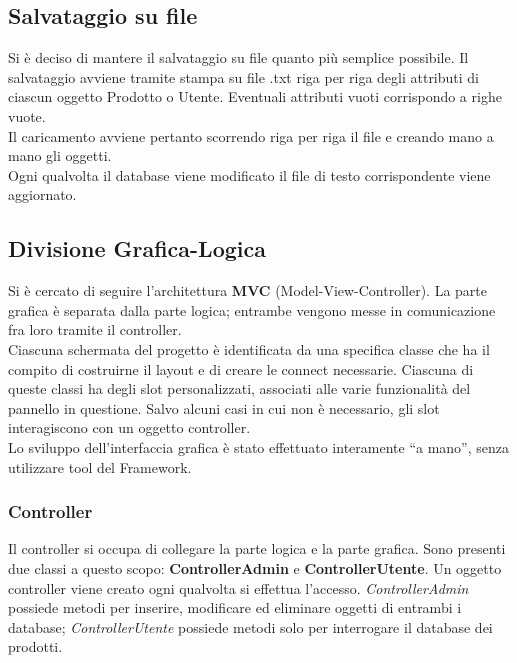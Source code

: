 \documentclass[a4paper,10pt] {article}
\begin{document}
\subsection{Salvataggio su file}
Si è deciso di mantere il salvataggio su file quanto più semplice possibile. Il 
salvataggio avviene tramite stampa su file .txt riga per riga degli attributi 
di 
ciascun oggetto Prodotto o Utente. Eventuali attributi vuoti corrispondo a 
righe 
vuote.\\
Il caricamento avviene pertanto scorrendo riga per riga il file e creando mano 
a 
mano gli oggetti.\\
Ogni qualvolta il database viene modificato il file di testo corrispondente 
viene aggiornato.

\subsection{Divisione Grafica-Logica}
Si è cercato di seguire l'architettura \textbf{MVC} (Model-View-Controller). La 
parte grafica è separata dalla parte logica; entrambe vengono messe in 
comunicazione
fra loro tramite il controller.\\
Ciascuna schermata del progetto è identificata da una specifica classe che ha 
il 
compito di costruirne il layout e di creare le connect necessarie. Ciascuna di
queste classi ha degli slot personalizzati, associati alle varie funzionalità 
del pannello in questione. Salvo alcuni casi in cui non è necessario, gli slot 
interagiscono con un oggetto controller. \\
Lo sviluppo dell'interfaccia grafica è stato effettuato interamente ``a mano'', 
senza utilizzare tool del Framework.

\subsubsection{Controller}
Il controller si occupa di collegare la parte logica e la parte grafica. Sono 
presenti due classi a questo scopo: \textbf{ControllerAdmin} e 
\textbf{ControllerUtente}.
Un oggetto controller viene creato ogni qualvolta si effettua l'accesso. 
\textsl{ControllerAdmin} possiede metodi per inserire, modificare ed eliminare 
oggetti di
entrambi i database; \textsl{ControllerUtente} possiede metodi solo per 
interrogare il database dei prodotti.
\end{document}
